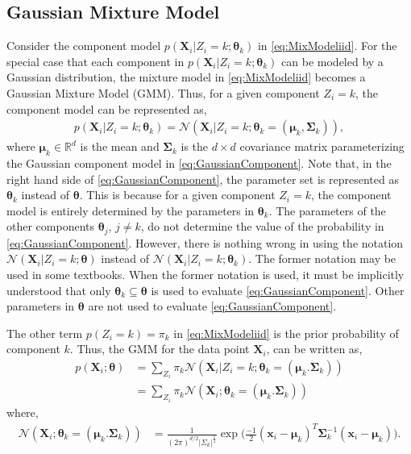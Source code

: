 \documentclass[twoside,11pt,a4paper]{book}
\newcommand{\data}[1]{\mathbf{#1}}
\begin{document}
\subsection{Gaussian Mixture Model}
Consider the component model $p(\data{X}_{i}|Z_{i} =k; \bm{\theta}_{k})$ in \eqref{eq:MixModeliid}. For the special case that each component in $p(\data{X}_{i}|Z_{i} = k; \bm{\theta}_{k})$ can be modeled by a Gaussian distribution, the mixture model in \eqref{eq:MixModeliid} becomes a Gaussian Mixture Model (GMM). Thus, for a given component $Z_{i} = k$, the component model can be represented as,
\begin{align}
p(\data{X}_{i}|Z_{i} = k; \bm{\theta}_{k}) = \mathcal{N}(\data{X}_{i}|Z_{i} = k; \bm{\theta}_{k} = (\bm{\mu}_{k}, \bm{\Sigma}_{k}) ), \label{eq:GaussianComponent}
\end{align}
where $\bm{\mu}_{k} \in \mathbb{R}^{d}$ is the mean and $\bm{\Sigma}_{k}$ is the $d \times d$ covariance matrix parameterizing the Gaussian component model in \eqref{eq:GaussianComponent}.
Note that, in the right hand side of \eqref{eq:GaussianComponent}, the parameter set is represented as $\bm{\theta}_{k}$ instead of $\bm{\theta}$. This is because for a given component $Z_{i} = k$, the component model is entirely determined by the parameters in $\bm{\theta}_{k}$. The parameters of the other components $\bm{\theta}_{j}$, $j \ne k$, do not determine the value of the probability in \eqref{eq:GaussianComponent}. However, there is nothing wrong in using the notation $\mathcal{N}(\data{X}_{i}|Z_{i} = k; \bm{\theta})$ instead of $\mathcal{N}(\data{X}_{i}|Z_{i} = k; \bm{\theta}_{k})$. The former notation may be used in some textbooks. When the former notation is used, it must be implicitly understood that only $\bm{\theta}_{k} \subseteq \bm{\theta}$ is used to evaluate \eqref{eq:GaussianComponent}. Other parameters in $\bm{\theta}$ are not used to evaluate \eqref{eq:GaussianComponent}.

The other term $p(Z_{i} = k) = \pi_{k}$ in \eqref{eq:MixModeliid} is the prior probability of component $k$. Thus, the GMM for the data point $\data{X}_{i}$, can be written as,
\begin{align}
p(\data{X}_{i}; \bm{\theta}) &= \sum_{Z_{i}} \pi_{k} \mathcal{N}(\data{X}_{i}|Z_{i} = k; \bm{\theta}_{k} = (\bm{\mu}_{k}. \bm{\Sigma}_{k}) ) \nonumber \\ 
&= \sum_{Z_{i}} \pi_{k} \mathcal{N}(\data{X}_{i}; \bm{\theta}_{k} = (\bm{\mu}_{k}. \bm{\Sigma}_{k}) )
\label{eq:GMM1}
\end{align}
where,
\begin{align}
\mathcal{N}(\data{X}_{i}; \bm{\theta}_{k} = (\bm{\mu}_{k}. \bm{\Sigma}_{k}) ) &= \frac{1}{(2\pi)^{d/2} |\Sigma_{k}|^{\frac{1}{2}}} \exp{\Bigg(\frac{-1}{2}(\bm{x}_{i} - \bm{\mu}_{k})^{T}\bm{\Sigma}_{k}^{-1}(\bm{x}_{i} - \bm{\mu}_{k})\Bigg)}.
\end{align}
\end{document}
